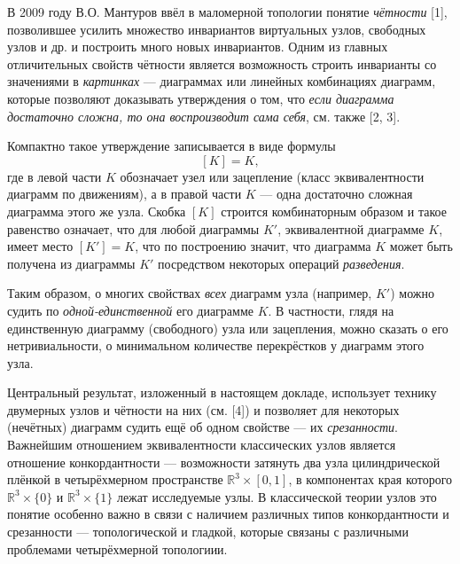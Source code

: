 


\vzmscaption


В 2009 году В.О. Мантуров ввёл в маломерной топологии понятие {\em чётности} [1], позволившее усилить множество
инвариантов виртуальных узлов, свободных узлов и др. и построить много новых инвариантов. Одним из главных отличительных свойств чётности является возможность строить инварианты со значениями в {\em картинках} --- диаграммах или линейных комбинациях диаграмм, которые позволяют доказывать утверждения о том, что {\em если диаграмма достаточно сложна, то она воспроизводит сама себя}, см. также [2, 3].

Компактно такое утверждение записывается в виде формулы $$[K]=K,$$ где в левой части $K$ обозначает узел или зацепление
(класс эквивалентности диаграмм по движениям), а в правой части $K$ --- одна достаточно сложная диаграмма этого же узла. Скобка $[K]$ строится комбинаторным образом и такое равенство означает, что для любой диаграммы $K'$, эквивалентной диаграмме $K$, имеет место $[K']=K$, что по построению значит, что диаграмма $K$ может быть получена из диаграммы $K'$ посредством некоторых операций {\em разведения}.

Таким образом, о многих свойствах {\em всех} диаграмм узла (например, $K'$) можно судить по {\em одной-единственной} его диаграмме $K$. В частности, глядя на единственную диаграмму (свободного) узла или зацепления, можно сказать о его нетривиальности, о минимальном количестве перекрёстков у диаграмм этого узла.

Центральный результат, изложенный в настоящем докладе, использует технику двумерных узлов и чётности на них (см. [4]) и позволяет для некоторых (нечётных) диаграмм судить ещё об одном свойстве --- их {\em срезанности}.
Важнейшим отношением эквивалентности классических узлов является отношение конкордантности --- возможности затянуть два узла цилиндрической плёнкой в четырёхмерном пространстве $\mathbb{R}^{3}\times [0,1]$, в компонентах края которого $\mathbb{R}^{3}\times \{0\}$ и $\mathbb{R}^{3}\times \{1\}$ лежат исследуемые узлы. В классической теории узлов это понятие особенно важно в связи с наличием различных типов конкордантности и срезанности --- топологической и гладкой, которые связаны с различными проблемами четырёхмерной топологиии.

